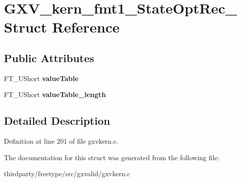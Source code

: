 \hypertarget{struct_g_x_v__kern__fmt1___state_opt_rec__}{}\section{G\+X\+V\+\_\+kern\+\_\+fmt1\+\_\+\+State\+Opt\+Rec\+\_\+ Struct Reference}
\label{struct_g_x_v__kern__fmt1___state_opt_rec__}
\subsection*{Public Attributes}
\begin{DoxyCompactItemize}
\item 
\mbox{\label{struct_g_x_v__kern__fmt1___state_opt_rec___a38fe4f68e9920da6fe8195149e67f738}} 
F\+T\+\_\+\+U\+Short {\bfseries value\+Table}
\item 
\mbox{\label{struct_g_x_v__kern__fmt1___state_opt_rec___a0fc314fdc527c2327d9e2fe385702184}} 
F\+T\+\_\+\+U\+Short {\bfseries value\+Table\+\_\+length}
\end{DoxyCompactItemize}


\subsection{Detailed Description}


Definition at line 201 of file gxvkern.\+c.



The documentation for this struct was generated from the following file\+:\begin{DoxyCompactItemize}
\item 
thirdparty/freetype/src/gxvalid/gxvkern.\+c\end{DoxyCompactItemize}
